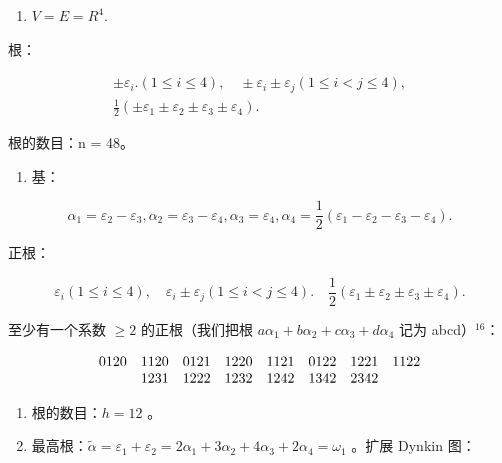 
\begin{enumerate}
\def\labelenumi{(\Roman{enumi})}
\tightlist
\item
  \(V = E = R^4.\)
\end{enumerate}

根：

\[
\begin{array}{c} \pm \varepsilon_ {i}. (1 \leqslant i \leqslant 4), \quad \pm \varepsilon_ {i} \pm \varepsilon_ {j} (1 \leqslant i <   j \leqslant 4), \\ \frac {1}{2} (\pm \varepsilon_ {1} \pm \varepsilon_ {2} \pm \varepsilon_ {3} \pm \varepsilon_ {4}). \end{array}
\]

根的数目：n = 48。

\begin{enumerate}
\def\labelenumi{(\Roman{enumi})}
\setcounter{enumi}{1}
\tightlist
\item
  基：
\end{enumerate}

\[
\alpha_ {1} = \varepsilon_ {2} - \varepsilon_ {3}, \alpha_ {2} = \varepsilon_ {3} - \varepsilon_ {4}, \alpha_ {3} = \varepsilon_ {4}, \alpha_ {4} = \frac {1}{2} (\varepsilon_ {1} - \varepsilon_ {2} - \varepsilon_ {3} - \varepsilon_ {4}).
\]

正根：

\[
\varepsilon_ {i} (1 \leqslant i \leqslant 4), \quad \varepsilon_ {i} \pm \varepsilon_ {j} (1 \leqslant i <   j \leqslant 4). \quad \frac {1}{2} (\varepsilon_ {1} \pm \varepsilon_ {2} \pm \varepsilon_ {3} \pm \varepsilon_ {4}).
\]

至少有一个系数 \(\geqslant2\) 的正根（我们把根 \(a\alpha_{1}+b\alpha_{2}+c\alpha_{3}+d\alpha_{4}\) 记为 abcd）\(^{16}\)：

\[
\begin{array}{c c c c c c c c} 0 1 2 0 & 1 1 2 0 & 0 1 2 1 & 1 2 2 0 & 1 1 2 1 & 0 1 2 2 & 1 2 2 1 & 1 1 2 2 \\ & 1 2 3 1 & 1 2 2 2 & 1 2 3 2 & 1 2 4 2 & 1 3 4 2 & 2 3 4 2 \end{array}
\]

\begin{enumerate}
\def\labelenumi{(\Roman{enumi})}
\setcounter{enumi}{2}
\item
  根的数目：\(h = 12\) 。
\item
  最高根：\(\tilde{\alpha} = \varepsilon_1 + \varepsilon_2 = 2\alpha_1 + 3\alpha_2 + 4\alpha_3 + 2\alpha_4 = \omega_1\) 。扩展 Dynkin 图：
\end{enumerate}

